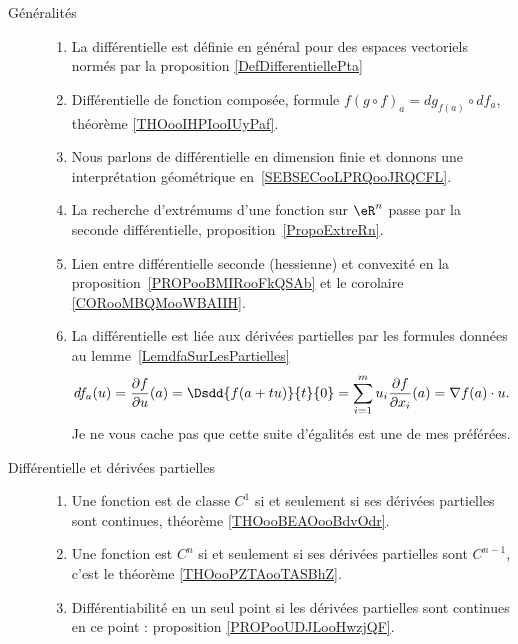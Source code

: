 \begin{description}
    \item[Généralités] 
\begin{enumerate}
    \item
        La différentielle est définie en général pour des espaces vectoriels normés par la proposition \ref{DefDifferentiellePta}
    \item
        Différentielle de fonction composée, formule \( f(g\circ f)_a=dg_{f(a)}\circ df_a\), théorème \ref{THOooIHPIooIUyPaf}.
    \item
        Nous parlons de différentielle en dimension finie et donnons une interprétation géométrique en~\ref{SEBSECooLPRQooJRQCFL}.
    \item
        La recherche d'extrémums d'une fonction sur \( \eR^n\) passe par la seconde différentielle, proposition~\ref{PropoExtreRn}.
    \item
        Lien entre différentielle seconde (hessienne) et convexité en la proposition~\ref{PROPooBMIRooFkQSAb} et le corolaire \ref{CORooMBQMooWBAIIH}.
    \item
        La différentielle est liée aux dérivées partielles par les formules données au lemme~\ref{LemdfaSurLesPartielles}
	\begin{equation}
        df_a(u)=\frac{ \partial f }{ \partial u }(a)=\Dsdd{ f(a+tu) }{t}{0}=\sum_{i=1}^mu_i\frac{ \partial f }{ \partial x_i }(a)=\nabla f(a)\cdot u.
	\end{equation}
    Je ne vous cache pas que cette suite d'égalités est une de mes préférées.
\end{enumerate}
\item[Différentielle et dérivées partielles]
    \begin{enumerate}
    \item
        Une fonction est de classe \( C^1\) si et seulement si ses dérivées partielles sont continues, théorème \ref{THOooBEAOooBdvOdr}.
    \item
        Une fonction est \( C^n\) si et seulement si ses dérivées partielles sont \( C^{n-1}\), c'est le théorème \ref{THOooPZTAooTASBhZ}.
    \item
        Différentiabilité en un seul point si les dérivées partielles sont continues en ce point : proposition \ref{PROPooUDJLooHwzjQF}.
    \end{enumerate}
\end{description}

